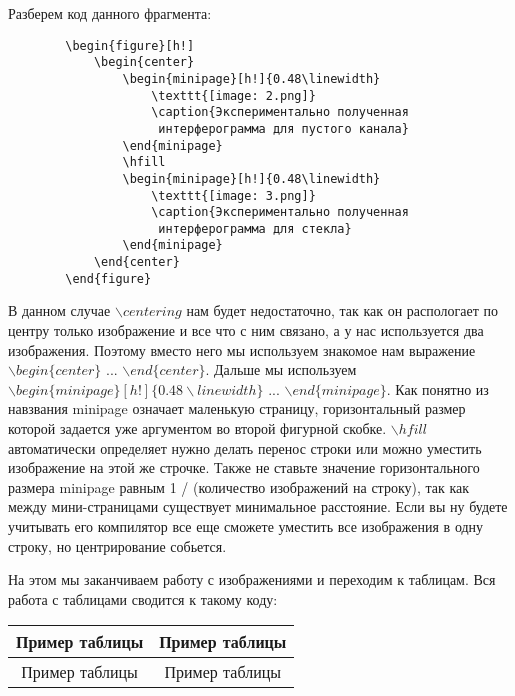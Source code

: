     Разберем код данного фрагмента:
    
    \begin{verbatim}
        \begin{figure}[h!]
            \begin{center}
                \begin{minipage}[h!]{0.48\linewidth}
                    \texttt{[image: 2.png]}
                    \caption{Экспериментально полученная
                     интерферограмма для пустого канала}
                \end{minipage}
                \hfill
                \begin{minipage}[h!]{0.48\linewidth}
                    \texttt{[image: 3.png]}
                    \caption{Экспериментально полученная
                     интерферограмма для стекла}
                \end{minipage}
            \end{center}
        \end{figure}
    \end{verbatim}
    
    В данном случае $\backslash centering$ нам будет недостаточно, так как он распологает по центру только изображение и все что с ним связано, а у нас используется два изображения. Поэтому вместо него мы используем знакомое нам выражение $\backslash begin\{center\}$ ... $\backslash end\{center\}$. Дальше мы используем $\backslash begin\{minipage\}[h!]\{0.48 \backslash linewidth\}$ ... $\backslash end\{minipage\}$. Как понятно из навзвания minipage означает маленькую страницу, горизонтальный размер которой задается уже аргументом во второй фигурной скобке. $\backslash hfill$ автоматически определяет нужно делать перенос строки или можно уместить изображение на этой же строчке. Также не ставьте значение горизонтального размера minipage равным 1 / (количество изображений на строку), так как между мини-страницами существует минимальное расстояние. Если вы ну будете учитывать его компилятор все еще сможете уместить все изображения в одну строку, но центрирование собьется.
    
    На этом мы заканчиваем работу с изображениями и переходим к таблицам. Вся работа с таблицами сводится к такому коду:
    
    \vspace{0.5cm}   
    
    \begin{center}    
        \begin{tabular}{|c|c|}
        \hline 
        Пример таблицы & Пример таблицы \\ 
        \hline 
        Пример таблицы & Пример таблицы \\ 
        \hline 
        \end{tabular}
    \end{center}
    
